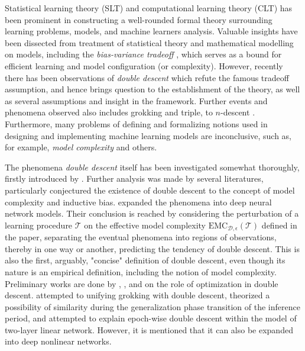 Statistical learning theory (SLT) and computational learning theory (CLT) \cite{Vapnik1999-VAPTNO,10.5555/2371238,10.5555/2621980,STL_Hajek_Maxim_2021,bousquet2020theoryuniversallearning} has been prominent in constructing a well-rounded formal theory surrounding learning problems, models, and machine learners analysis. Valuable insights have been dissected from treatment of statistical theory and mathematical modelling on models, including the \textit{bias-variance tradeoff} \cite{6797087,Domingos2000AUB}, which serves as a bound for efficient learning and model configuration (or complexity). However, recently there has been observations of \textit{double descent} \cite{belkin_reconciling_2019,schaeffer_double_2023,nakkiran_deep_2019,lafon_understanding_2024} which refute the famous tradeoff assumption, and hence brings question to the establishment of the theory, as well as several assumptions and insight in the framework. Further events and phenomena observed also includes grokking and triple, to $n$-descent \cite{davies_unifying_2023,d_ascoli_triple_2020}. Furthermore, many problems of defining and formalizing notions used in designing and implementing machine learning models are inconclusive, such as, for example, \textit{model complexity} and others. 

The phenomena \textit{double descent} itself has been investigated somewhat thoroughly, firstly introduced by \cite{belkin_reconciling_2019}. Further analysis was made by several literatures, particularly conjectured the existence of double descent to the concept of model complexity and inductive bias. \cite{nakkiran_deep_2019} expanded the phenomena into deep neural network models. Their conclusion is reached by considering the perturbation of a learning procedure $\mathcal{T}$ on the effective model complexity $\mathrm{EMC}_{\mathcal{D},\epsilon}(\mathcal{T})$ defined in the paper, separating the eventual phenomena into regions of observations, thereby in one way or another, predicting the tendency of double descent. This is also the first, arguably, "concise" definition of double descent, even though its nature is an empirical definition, including the notion of model complexity. Preliminary works are done by \cite{lafon_understanding_2024}, \cite{schaeffer_double_2023}, and \cite{liu2023understandingroleoptimizationdouble} on the role of optimization in double descent. \cite{davies_unifying_2023} attempted to unifying grokking with double descent, theorized a possibility of similarity during the generalization phase transition of the inference period, and \cite{olmin2024understandingepochwisedoubledescent} attempted to explain epoch-wise double descent within the model of two-layer linear network. However, it is mentioned that it can also be expanded into deep nonlinear networks. 

